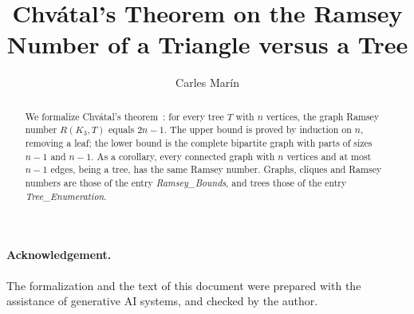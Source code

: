 \documentclass[10pt,a4paper]{article}
\begin{document}
\title{Chv\'atal's Theorem on the Ramsey Number of a Triangle versus a Tree}
\author{Carles Mar\'in}
\maketitle

\begin{abstract}
We formalize Chv\'atal's theorem~\cite{Chvatal1977}: for every tree $T$ with $n$ vertices, the graph Ramsey number $R(K_3,T)$ equals $2n-1$. The upper bound is proved by induction on $n$, removing a leaf; the lower bound is the complete bipartite graph with parts of sizes $n-1$ and $n-1$. As a corollary, every connected graph with $n$ vertices and at most $n-1$ edges, being a tree, has the same Ramsey number. Graphs, cliques and Ramsey numbers are those of the entry \emph{Ramsey\_Bounds}, and trees those of the entry \emph{Tree\_Enumeration}.
\end{abstract}

\paragraph{Acknowledgement.} The formalization and the text of this document were prepared with the
assistance of generative AI systems, and checked by the author.

\tableofcontents

\newpage





\end{document}
